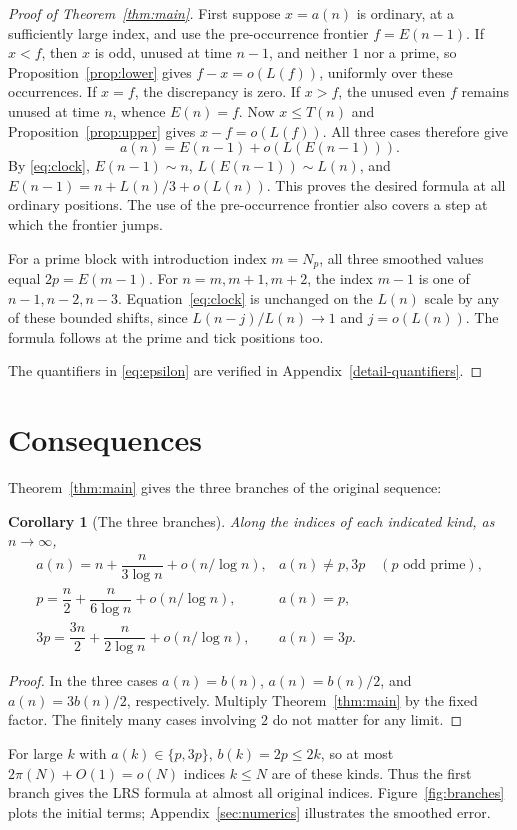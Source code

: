 \documentclass[11pt]{article}
\newtheorem{corollary}[theorem]{Corollary}
\theoremstyle{remark}
\begin{document}
\begin{proof}[Proof of Theorem~\ref{thm:main}]

First suppose $x=a(n)$ is ordinary, at a sufficiently large index,
and use the pre-occurrence frontier $f=E(n-1)$.
If $x<f$, then $x$ is odd, unused at time $n-1$, and neither $1$
nor a prime, so Proposition~\ref{prop:lower} gives
$f-x=o(L(f))$, uniformly over these occurrences.
If $x=f$, the discrepancy is zero.
If $x>f$, the unused even $f$ remains unused at time $n$, whence
$E(n)=f$. Now $x\leq T(n)$ and
Proposition~\ref{prop:upper} gives $x-f=o(L(f))$.
All three cases therefore give
\[
 a(n)=E(n-1)+o(L(E(n-1))).
\]
By \eqref{eq:clock}, $E(n-1)\sim n$, $L(E(n-1))\sim L(n)$,
and $E(n-1)=n+L(n)/3+o(L(n))$. This proves the desired formula
at all ordinary positions. The use of the pre-occurrence frontier
also covers a step at which the frontier jumps.

For a prime block with introduction index $m=N_p$, all three
smoothed values equal $2p=E(m-1)$.
For $n=m,m+1,m+2$, the index $m-1$ is one of $n-1,n-2,n-3$.
Equation~\eqref{eq:clock} is unchanged on the $L(n)$ scale by any
of these bounded shifts, since $L(n-j)/L(n)\to1$ and
$j=o(L(n))$. The formula follows at the prime and tick positions too.


\par\noindent The quantifiers in \eqref{eq:epsilon} are verified in Appendix~\ref{detail-quantifiers}.
\end{proof}
\section{Consequences}\label{sec:branches}
Theorem~\ref{thm:main} gives the three branches of the original sequence:
\begin{corollary}[The three branches]\label{cor:branches}
Along the indices of each indicated kind, as $n\to\infty$,
\[
\begin{array}{ll}
 a(n)=n+\dfrac{n}{3\log n}+o(n/\log n),&
       a(n)\ne p,3p\quad(p\text{ odd prime}),\\[4pt]
 p=\dfrac n2+\dfrac{n}{6\log n}+o(n/\log n),&a(n)=p,\\[4pt]
 3p=\dfrac{3n}{2}+\dfrac{n}{2\log n}+o(n/\log n),&a(n)=3p.
\end{array}
\]
\end{corollary}
\begin{proof}
In the three cases $a(n)=b(n)$, $a(n)=b(n)/2$, and
$a(n)=3b(n)/2$, respectively. Multiply Theorem~\ref{thm:main}
by the fixed factor. The finitely many cases involving $2$ do not
matter for any limit.
\end{proof}
For large $k$ with $a(k)\in\{p,3p\}$, $b(k)=2p\leq2k$, so at most
$2\pi(N)+O(1)=o(N)$ indices $k\leq N$ are of these kinds. Thus the first
branch gives the LRS formula at almost all original indices.
Figure~\ref{fig:branches} plots the initial terms; Appendix~\ref{sec:numerics}
illustrates the smoothed error.
\end{document}
